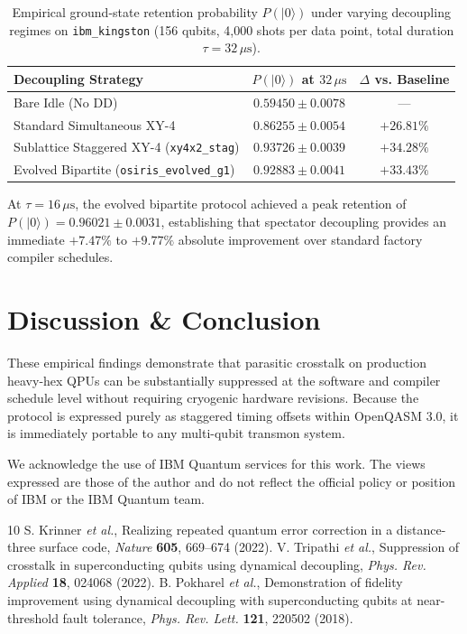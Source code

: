 \documentclass[aps,prapplied,reprint,superscriptaddress]{revtex4-2}
\begin{document}
\begin{table}[h!]
\centering
\caption{Empirical ground-state retention probability $P(|0\rangle)$ under varying decoupling regimes on \texttt{ibm\_kingston} (156 qubits, 4,000 shots per data point, total duration $\tau = 32\,\mu\text{s}$).}
\begin{tabular}{lcc}
\hline\hline
Decoupling Strategy & $P(|0\rangle)$ at $32\,\mu\text{s}$ & $\Delta$ vs. Baseline \\
\hline
Bare Idle (No DD) & $0.59450 \pm 0.0078$ & --- \\
Standard Simultaneous XY-4 & $0.86255 \pm 0.0054$ & $+26.81\%$ \\
Sublattice Staggered XY-4 (\texttt{xy4x2\_stag}) & $\mathbf{0.93726} \pm \mathbf{0.0039}$ & $\mathbf{+34.28\%}$ \\
Evolved Bipartite (\texttt{osiris\_evolved\_g1}) & $\mathbf{0.92883} \pm \mathbf{0.0041}$ & $+33.43\%$ \\
\hline\hline
\end{tabular}
\label{tab:results}
\end{table}

At $\tau = 16\,\mu\text{s}$, the evolved bipartite protocol achieved a peak retention of $P(|0\rangle) = 0.96021 \pm 0.0031$, establishing that spectator decoupling provides an immediate $+7.47\%$ to $+9.77\%$ absolute improvement over standard factory compiler schedules.

\section{Discussion \& Conclusion}
These empirical findings demonstrate that parasitic crosstalk on production heavy-hex QPUs can be substantially suppressed at the software and compiler schedule level without requiring cryogenic hardware revisions. Because the protocol is expressed purely as staggered timing offsets within OpenQASM 3.0, it is immediately portable to any multi-qubit transmon system.

\begin{acknowledgments}
We acknowledge the use of IBM Quantum services for this work. The views expressed are those of the author and do not reflect the official policy or position of IBM or the IBM Quantum team.
\end{acknowledgments}

\begin{thebibliography}{10}
 S. Krinner \textit{et al.}, Realizing repeated quantum error correction in a distance-three surface code, \textit{Nature} \textbf{605}, 669--674 (2022).
 V. Tripathi \textit{et al.}, Suppression of crosstalk in superconducting qubits using dynamical decoupling, \textit{Phys. Rev. Applied} \textbf{18}, 024068 (2022).
 B. Pokharel \textit{et al.}, Demonstration of fidelity improvement using dynamical decoupling with superconducting qubits at near-threshold fault tolerance, \textit{Phys. Rev. Lett.} \textbf{121}, 220502 (2018).
\end{thebibliography}
\end{document}
